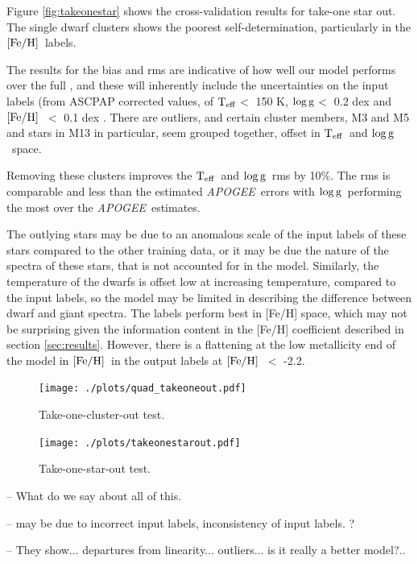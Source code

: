 \documentclass[12pt, preprint]{aastex}
\newcommand{\teff}{\mbox{$\rm T_{eff}$}}
\newcommand{\feh}{\mbox{$\rm [Fe/H]$}}
\newcommand{\logg}{\mbox{$\rm \log g$}}
\newcommand{\apogee}{\textsl{APOGEE}}
\begin{document}
Figure \ref{fig:takeonestar} shows the cross-validation results for take-one star out. The single dwarf clusters shows the poorest self-determination, particularly in the \feh\ labels. 


The results for the bias and rms are indicative of how well our model performs over the full , and these will inherently include the uncertainties on the input labels (from ASCPAP corrected values, of \teff $<$ 150 K, \logg $<$ 0.2 dex and \feh\ $<$ 0.1 dex \citep{Meszaros2013}. There are outliers, and certain cluster members, M3 and M5 and stars in M13 in particular, seem grouped together, offset in \teff\ and \logg\ space. 

Removing these clusters improves the \teff\ and \logg\ rms by 10\%. The rms is comparable and less than the estimated \apogee\ errors with \logg\ performing the most over the \apogee\ estimates.  

The outlying stars may be due to an anomalous scale of the input labels of these stars compared to the other training data, or it may be due the nature of the spectra of these stars, that is not accounted for in the model. Similarly, the temperature of the dwarfs is offset low at increasing temperature, compared to the input labels, so the model may be limited in describing the difference between dwarf and giant spectra. The labels perform best in [Fe/H] space, which may not be surprising given the information content in the [Fe/H] coefficient described in section \ref{sec:results}. However, there is a flattening at the low metallicity end of the model in \feh\ in the output labels at \feh\ $<$ -2.2. 






\begin{figure}[h!]
\centering
  \texttt{[image: ./plots/quad\_takeoneout.pdf]}
\caption{Take-one-cluster-out test.}
\label{fig:takeoneout}
\end{figure}

\begin{figure}[h!]
\centering
  \texttt{[image: ./plots/takeonestarout.pdf]}
\caption{Take-one-star-out test.}
\label{fig:takeoneout}
\end{figure}

-- What do we say about all of this. 

-- may be due to incorrect input labels, inconsistency of input labels. ?

-- They show... departures from linearity... outliers... is it really a better model?..
\end{document}
